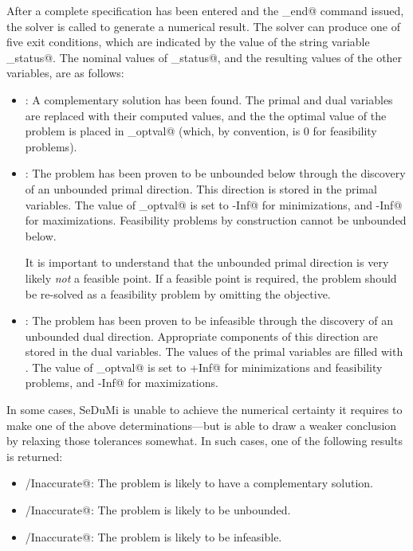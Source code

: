 \documentclass[12pt]{article}
\begin{document}
After a complete \cvx specification has been entered and the \verb@cvx_end@ command 
issued, the solver is called to generate a numerical result. The solver can produce
one of five exit conditions, which are indicated by the value of the string variable
\verb@cvx_status@. The nominal values of \verb@cvx_status@, and the resulting 
values of the other variables, are as follows:
\begin{itemize}
	\item \verb@Solved@: A complementary solution has been found.
	      The primal and dual variables are replaced with their computed values, and the
	      the optimal value of the problem is placed in \verb@cvx_optval@ (which, by
	      convention, is $0$ for feasibility problems).
	\item \verb@Unbounded@: The problem has been proven to be unbounded below
	      through the discovery of an unbounded primal direction. This direction
	      is stored in the primal variables. The value of \verb@cvx_optval@
	      is set to \verb@-Inf@ for minimizations, and
	      \verb@-Inf@ for maximizations. Feasibility problems by construction
	      cannot be unbounded below.
	      
	      It is important to understand that the unbounded primal direction is very
	      likely \emph{not} a feasible point. If a feasible point is required, the 
	      problem should be re-solved as a feasibility problem by omitting the objective.
	\item \verb@Infeasible@: The problem has been proven to be infeasible
	      through the discovery of an unbounded dual direction. Appropriate
	      components of this direction are stored in the dual variables. The values of the
	      primal variables are filled with \verb@NaN@s. The value of \verb@cvx_optval@
	      is set to \verb@+Inf@ for minimizations and feasibility problems,
	      and \verb@-Inf@ for maximizations.
\end{itemize}
In some cases, SeDuMi is unable to achieve the numerical certainty it requires to
make one of the above determinations---but is able to draw a weaker conclusion
by relaxing those tolerances somewhat. In such cases, one of the following
results is returned:
\begin{itemize}
	\item \verb@Solved/Inaccurate@: The problem is likely to have a complementary solution.
	\item \verb@Unbounded/Inaccurate@: The problem is likely to be unbounded.
	\item \verb@Infeasible/Inaccurate@: The problem is likely to be infeasible.
\end{itemize}
\end{document}
